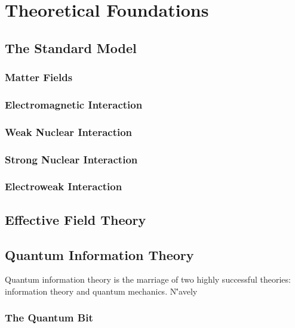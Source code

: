 
\chapter{Theoretical Foundations}
\label{ch:theory}

\section{The Standard Model}

\subsection{Matter Fields}

\subsection{Electromagnetic Interaction}

\subsection{Weak Nuclear Interaction}

\subsection{Strong Nuclear Interaction}

\subsection{Electroweak Interaction}

\section{Effective Field Theory}

\section{Quantum Information Theory}

Quantum information theory is the marriage of two highly successful theories: information theory and quantum mechanics. N\''avely

\subsection{The Quantum Bit}

